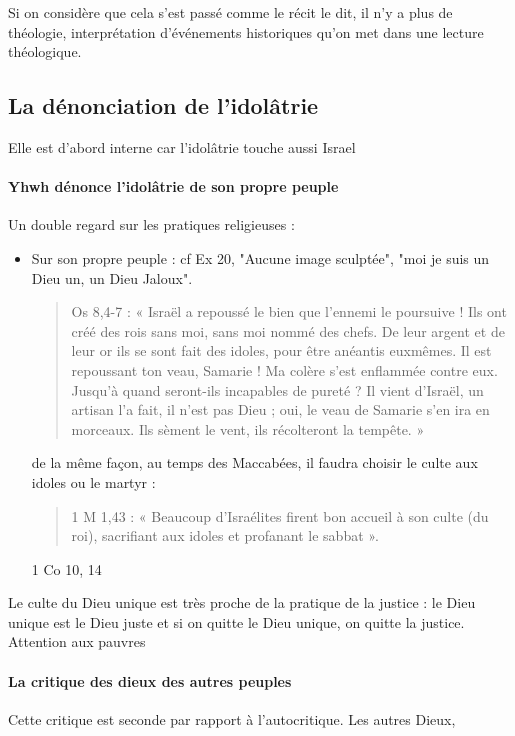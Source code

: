 Si on considère que cela s'est passé comme le récit le dit, il n'y a plus de théologie, interprétation d'événements historiques qu'on met dans une lecture théologique.


\subsection{La dénonciation de l’idolâtrie} Elle est d'abord interne car l'idolâtrie touche aussi Israel

\paragraph{Yhwh dénonce l’idolâtrie de son propre peuple} Un double regard sur les pratiques religieuses : 
\begin{itemize}
    \item Sur son propre peuple : cf Ex 20, "Aucune image sculptée", "moi je suis un Dieu un, un Dieu Jaloux".
    \begin{quote}
        Os 8,4-7 : « Israël a repoussé le bien que l’ennemi le poursuive ! Ils ont créé des rois sans moi, sans
moi nommé des chefs. De leur argent et de leur or ils se sont fait des idoles, pour être anéantis euxmêmes. Il est repoussant ton veau, Samarie ! Ma colère s’est enflammée contre eux. Jusqu’à quand
seront-ils incapables de pureté ? Il vient d’Israël, un artisan l’a fait, il n’est pas Dieu ; oui, le veau de
Samarie s’en ira en morceaux. Ils sèment le vent, ils récolteront la tempête. »
    \end{quote}
    de la même façon, au temps des Maccabées, il faudra choisir le culte aux idoles ou le martyr : 
    \begin{quote}
        1 M 1,43 : « Beaucoup d’Israélites firent bon accueil à son culte (du roi), sacrifiant aux idoles et
profanant le sabbat ».
    \end{quote}
    1 Co 10, 14
    
    
\end{itemize}



Le culte du Dieu unique est très proche de la pratique de la justice : le Dieu unique est le Dieu juste et si on quitte le Dieu unique, on quitte la justice. Attention aux pauvres


\paragraph{La critique des dieux des autres peuples} Cette critique est seconde par rapport à l'autocritique. Les autres Dieux, 

